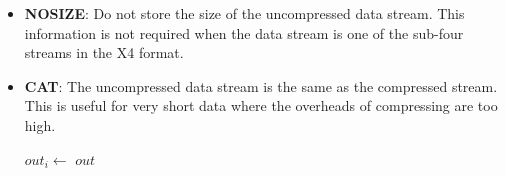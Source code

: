 \documentclass[a4paper]{article}
\begin{document}
\begin{itemize}
\item{\textbf{NOSIZE}:}
Do not store the size of the uncompressed data stream.  This
information is not required when the data stream is one of the
sub-four streams in the X4 format.

\item{\textbf{CAT}:}
The uncompressed data stream is the same as the compressed stream.
This is useful for very short data where the overheads of compressing
are too high.

\begin{algorithmic}[1]
    \State $out_i \gets $
  \EndFor
  \State \Return $out$
\EndFunction
\end{algorithmic}

% 
% 
% 
% 


\end{itemize}
\end{document}
